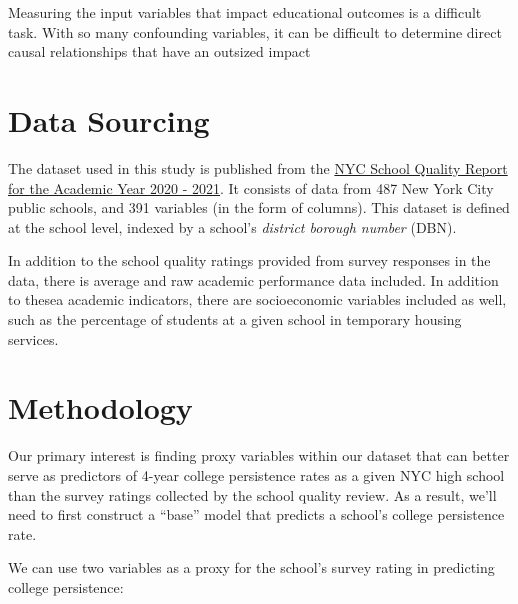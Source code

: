 \documentclass[
  man]{apa6}
\begin{document}
Measuring the input variables that impact educational outcomes is a difficult task. With so many confounding variables, it can be difficult to determine direct causal relationships that have an outsized impact

\hypertarget{data-sourcing}{%
\section{Data Sourcing}\label{data-sourcing}}

The dataset used in this study is published from the \href{https://data.cityofnewyork.us/Education/2020-2021-School-Quality-Reports-High-School/26je-vkp6}{NYC School Quality Report for the Academic Year 2020 - 2021}. It consists of data from 487 New York City public schools, and 391 variables (in the form of columns). This dataset is defined at the school level, indexed by a school's \emph{district borough number} (DBN).

In addition to the school quality ratings provided from survey responses in the data, there is average and raw academic performance data included. In addition to thesea academic indicators, there are socioeconomic variables included as well, such as the percentage of students at a given school in temporary housing services.

\hypertarget{methodology}{%
\section{Methodology}\label{methodology}}

Our primary interest is finding proxy variables within our dataset that can better serve as predictors of 4-year college persistence rates as a given NYC high school than the survey ratings collected by the school quality review. As a result, we'll need to first construct a ``base'' model that predicts a school's college persistence rate.

We can use two variables as a proxy for the school's survey rating in predicting college persistence:
\end{document}
